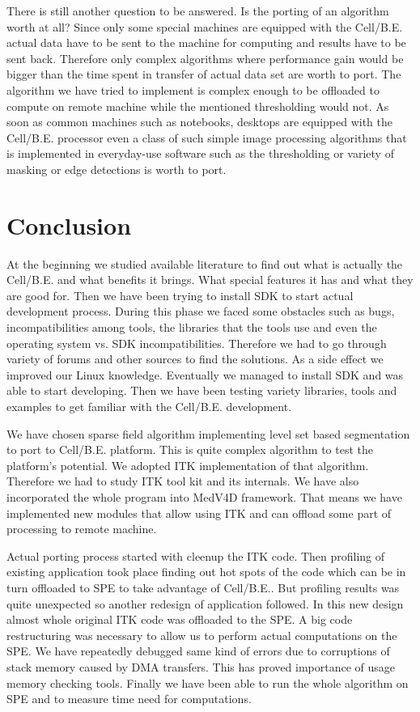 \par
There is still another question to be answered.
Is the porting of an algorithm worth at all?
Since only some special machines are equipped with the \mbox{Cell/B.E.} actual data have to be sent to the machine for computing and results have to be sent back.
Therefore only complex algorithms where performance gain would be bigger than the time spent in transfer of actual data set are worth to port.
The algorithm we have tried to implement is complex enough to be offloaded to compute on remote machine while the mentioned thresholding would not.
As soon as common machines such as notebooks, desktops are equipped with the \mbox{Cell/B.E.} processor even a class of such simple image processing algorithms that is implemented in everyday-use software such as the thresholding or variety of masking or edge detections is worth to port.

\chapter{Conclusion}

\par
At the beginning we studied available literature to find out what is actually the \mbox{Cell/B.E.} and what benefits it brings.
What special features it has and what they are good for.
Then we have been trying to install SDK to start actual development process.
During this phase we faced some obstacles such as bugs, incompatibilities among tools, the libraries that the tools use and even the operating system vs. SDK incompatibilities.
Therefore we had to go through variety of forums and other sources to find the solutions.
As a side effect we improved our Linux knowledge.
Eventually we managed to install SDK and was able to start developing.
Then we have been testing variety libraries, tools and examples to get familiar with the \mbox{Cell/B.E.} development.

\par
We have chosen sparse field algorithm implementing level set based segmentation to port to \mbox{Cell/B.E.} platform.
This is quite complex algorithm to test the platform's potential.
We adopted ITK implementation of that algorithm.
Therefore we had to study ITK tool kit and its internals.
We have also incorporated the whole program into MedV4D framework.
That means we have implemented new modules that allow using ITK and can offload some part of processing to remote machine.

\par
Actual porting process started with cleenup the ITK code.
Then profiling of existing application took place finding out hot spots of the code which can be in turn offloaded to SPE to take advantage of \mbox{Cell/B.E.}.
But profiling results was quite unexpected so another redesign of application followed.
In this new design almost whole original ITK code was offloaded to the SPE.
A big code restructuring was necessary to allow us to perform actual computations on the SPE.
We have repeatedly debugged same kind of errors due to corruptions of stack memory caused by DMA transfers.
This has proved importance of usage memory checking tools.
Finally we have been able to run the whole algorithm on SPE and to measure time need for computations.

